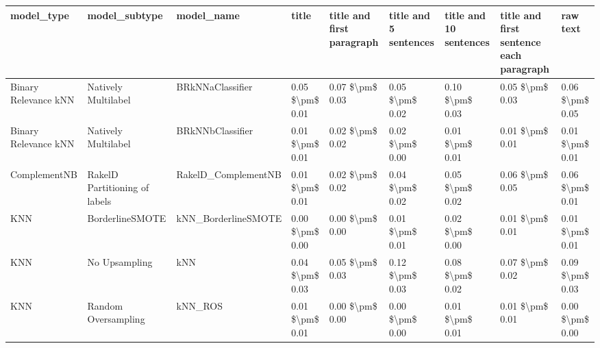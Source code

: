 \begin{tabular}{lllllllll}
\toprule
                     model\_type &                 model\_subtype &                                   model\_name &           title & title and first paragraph & title and 5 sentences & title and 10 sentences & title and first sentence each paragraph &            raw text \\
\midrule
           Binary Relevance kNN &           Natively Multilabel &                             BRkNNaClassifier & 0.05 \$\textbackslash pm\$ 0.01 &           0.07 \$\textbackslash pm\$ 0.03 &       0.05 \$\textbackslash pm\$ 0.02 &        0.10 \$\textbackslash pm\$ 0.03 &                         0.05 \$\textbackslash pm\$ 0.03 &     0.06 \$\textbackslash pm\$ 0.05 \\
           Binary Relevance kNN &           Natively Multilabel &                             BRkNNbClassifier & 0.01 \$\textbackslash pm\$ 0.01 &           0.02 \$\textbackslash pm\$ 0.02 &       0.02 \$\textbackslash pm\$ 0.00 &        0.01 \$\textbackslash pm\$ 0.01 &                         0.01 \$\textbackslash pm\$ 0.01 &     0.01 \$\textbackslash pm\$ 0.01 \\
                   ComplementNB & RakelD Partitioning of labels &                          RakelD\_ComplementNB & 0.01 \$\textbackslash pm\$ 0.01 &           0.02 \$\textbackslash pm\$ 0.02 &       0.04 \$\textbackslash pm\$ 0.02 &        0.05 \$\textbackslash pm\$ 0.02 &                         0.06 \$\textbackslash pm\$ 0.05 &     0.06 \$\textbackslash pm\$ 0.01 \\
                            KNN &               BorderlineSMOTE &                          kNN\_BorderlineSMOTE & 0.00 \$\textbackslash pm\$ 0.00 &           0.00 \$\textbackslash pm\$ 0.00 &       0.01 \$\textbackslash pm\$ 0.01 &        0.02 \$\textbackslash pm\$ 0.00 &                         0.01 \$\textbackslash pm\$ 0.01 &     0.01 \$\textbackslash pm\$ 0.01 \\
                            KNN &                 No Upsampling &                                          kNN & 0.04 \$\textbackslash pm\$ 0.03 &           0.05 \$\textbackslash pm\$ 0.03 &       0.12 \$\textbackslash pm\$ 0.03 &        0.08 \$\textbackslash pm\$ 0.02 &                         0.07 \$\textbackslash pm\$ 0.02 &     0.09 \$\textbackslash pm\$ 0.03 \\
                            KNN &           Random Oversampling &                                      kNN\_ROS & 0.01 \$\textbackslash pm\$ 0.01 &           0.00 \$\textbackslash pm\$ 0.00 &       0.00 \$\textbackslash pm\$ 0.00 &        0.01 \$\textbackslash pm\$ 0.01 &                         0.01 \$\textbackslash pm\$ 0.01 &     0.00 \$\textbackslash pm\$ 0.00 \\

\end{tabular}
